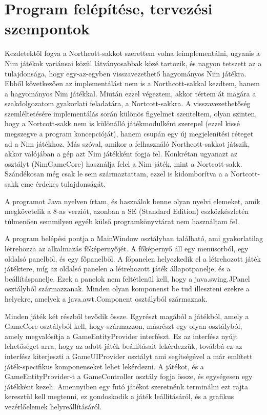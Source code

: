 \section{Program felépítése, tervezési szempontok} \label{section:implementation_design}
Kezdetektől fogva a Northcott-sakkot szerettem volna leimplementálni, ugyanis a Nim játékok variánsai közül látványosabbak közé tartozik, és nagyon tetszett az a tulajdonsága, hogy egy-az-egyben visszavezethető hagyományos Nim játékra. Ebből következően az implementálást nem is a Northcott-sakkal kezdtem, hanem a hagyományos Nim játékkal. Miután ezzel végeztem, akkor tértem át magára a szakdolgozatom gyakorlati feladatára, a Nortcott-sakkra. A visszavezethetőség szemléltetésére implementálás során különös figyelmet szenteltem, olyan szinten, hogy a Nortcott-sakk nem is különálló játékmodulként szerepel (ezzel kissé megszegve a program koncepcióját), hanem csupán egy új megjelenítési réteget ad a Nim játékhoz. Más szóval, amikor a felhasználó Northcott-sakkot játszik, akkor valójában a gép azt Nim játékként fogja fel. Konkrétan ugyanazt az osztályt (NimGameCore) használja felel a Nim játék, mint a Nortcott-sakk. Szándékosan még csak le sem származtattam, ezzel is kidomborítva a a Nortcott-sakk eme érdekes tulajdonságát.\ujsor

A programot Java nyelven írtam, és használok benne olyan nyelvi elemeket, amik megkövetelik a 8-as verziót, azonban a SE (Standard Edition) eszközkészletén túlmenően semmilyen egyéb külső programkönyvtárat nem használtam fel.\ujsor

A program belépési pontja a MainWindow osztályban található, ami gyakorlatilag létrehozza az alkalmazás főképernyőjét. A főképernyő áll egy menüsorból, egy oldalsó panelből, és egy főpanelből. A főpanelen helyezkedik el a létrehozott játék játéktere, míg az oldalsó panelen a létrehozott játék állapotpanelje, és a beállításpanelje. Ezek a panelok nem feltétlenül kell, hogy a java.swing.JPanel osztályból származzanak. Minden olyan komponenst be tud illeszteni ezekre a helyekre, amelyek a java.awt.Component osztályból származnak.\ujsor

Minden játék két részből tevődik össze. Egyrészt magából a játékból, amely a GameCore osztályból kell, hogy származzon, másrészt egy olyan osztályból, amely megvalósítja a GameEntityProvider interfészt. Ez az interfész nyújt lehetőséget arra, hogy az adott játék beállításait lekérdezzük, továbbá ez az interfész kiterjeszti a GameUIProvider osztályt ami segítségével a már említett játék-specifikus komponenseket lehet lekérdezni. A játékot, és a GameEntityProvider-t a GameController osztály fogja össze, és egységesen egy játékként kezeli. Amennyiben egy futó játékot szeretnénk terminálni ezt rajta keresztül kell megtenni, ez gondoskodik a játék leállításáról, és a grafikus vezérlőelemek helyreállításáról.\ujsor

